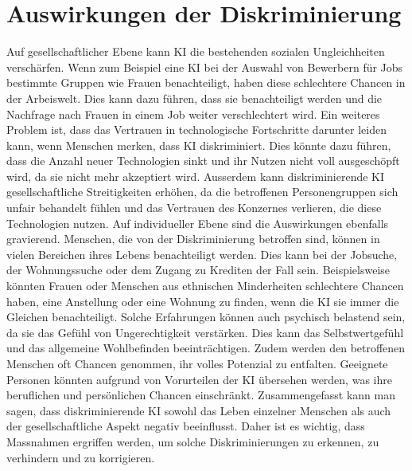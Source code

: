 \documentclass{article}
\begin{document}
\section{Auswirkungen der Diskriminierung}
Auf gesellschaftlicher Ebene kann KI die bestehenden sozialen Ungleichheiten verschärfen. Wenn zum Beispiel eine KI bei der Auswahl von Bewerbern für Jobs bestimmte Gruppen wie Frauen benachteiligt, haben diese schlechtere Chancen in der Arbeiswelt. Dies kann dazu führen, dass sie benachteiligt werden und die Nachfrage nach Frauen in einem Job weiter verschlechtert wird. Ein weiteres Problem ist, dass das Vertrauen in technologische Fortschritte darunter leiden kann, wenn Menschen merken, dass KI diskriminiert. Dies könnte dazu führen, dass die Anzahl neuer Technologien sinkt und ihr Nutzen nicht voll ausgeschöpft wird, da sie nicht mehr akzeptiert wird. Ausserdem kann diskriminierende KI gesellschaftliche Streitigkeiten erhöhen, da die betroffenen Personengruppen sich unfair behandelt fühlen und das Vertrauen des Konzernes verlieren, die diese Technologien nutzen. Auf individueller Ebene sind die Auswirkungen ebenfalls gravierend. Menschen, die von der Diskriminierung betroffen sind, können in vielen Bereichen ihres Lebens benachteiligt werden. Dies kann bei der Jobsuche, der Wohnungssuche oder dem Zugang zu Krediten der Fall sein. Beispielsweise könnten Frauen oder Menschen aus ethnischen Minderheiten schlechtere Chancen haben, eine Anstellung oder eine Wohnung zu finden, wenn die KI sie immer die Gleichen benachteiligt. Solche Erfahrungen können auch psychisch belastend sein, da sie das Gefühl von Ungerechtigkeit verstärken. Dies kann das Selbstwertgefühl und das allgemeine Wohlbefinden beeinträchtigen. Zudem werden den betroffenen Menschen oft Chancen genommen, ihr volles Potenzial zu entfalten. Geeignete Personen könnten aufgrund von Vorurteilen der KI übersehen werden, was ihre beruflichen und persönlichen Chancen einschränkt. Zusammengefasst kann man sagen, dass diskriminierende KI sowohl das Leben einzelner Menschen als auch der gesellschaftliche Aspekt negativ beeinflusst. Daher ist es wichtig, dass Massnahmen ergriffen werden, um solche Diskriminierungen zu erkennen, zu verhindern und zu korrigieren. 
\end{document}
